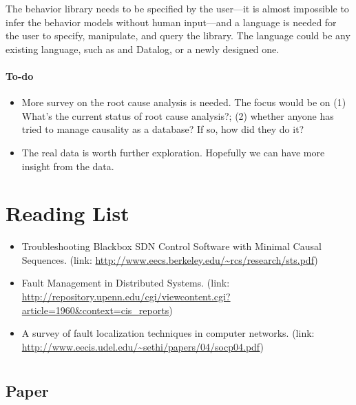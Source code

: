 \documentclass{article}
\begin{document}
The behavior library needs to be specified by the user---it is almost impossible
to infer the behavior models without human input---and a language is needed for
the user to specify, manipulate, and query the library. The language could be any
existing language, such as \saf{} and Datalog, or a newly designed one.

\paragraph{To-do}
\begin{itemize}
\item More survey on the root cause analysis is needed. The focus would be on
  (1) What's the current status of root cause analysis?; (2) whether anyone has
  tried to manage causality as a database? If so, how did they do it?
\item The real data is worth further exploration. Hopefully we can have more
  insight from the data.
\end{itemize}


\section{Reading List}
\label{sec:read}

\begin{itemize}

\item Troubleshooting Blackbox SDN Control Software with Minimal Causal
Sequences. (link: \url{http://www.eecs.berkeley.edu/~rcs/research/sts.pdf})

\item Fault Management in Distributed Systems. (link:
\url{http://repository.upenn.edu/cgi/viewcontent.cgi?article=1960&context=cis_reports}) 

\item A survey of fault localization techniques in computer networks. (link: \url{http://www.eecis.udel.edu/~sethi/papers/04/socp04.pdf})

\end{itemize}

\section{\saf{}}
\label{sec:saf}

\subsection{Paper}
\label{sec:safpaper}
\end{document}
